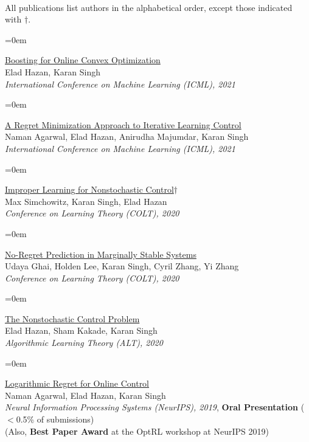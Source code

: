 \documentclass{scrartcl}
\newcommand{\Description}[1]{\hangindent=0em\hangafter=0\noindent\raggedright {#1}\par\normalsize\vspace{1em}}
\newcommand{\spacedlowallcaps}[1]{{\Large\textls[80]{\scshape \MakeTextLowercase{#1}}}}
\begin{document}
\begin{cv}{}\vspace{1.0em} 
\vspace{0.5em}\\
\noindent All publications list authors in the alphabetical order, except those indicated with $\dagger$.

\vspace{1.5em}

\noindent\spacedlowallcaps{Peer-reviewed Publications} 

\vspace{0.5em}

\Description{\href{https://proceedings.mlr.press/v139/hazan21a/hazan21a.pdf}{Boosting for Online Convex Optimization}
\\ Elad Hazan, Karan Singh\\ \textit{International Conference on Machine Learning (ICML), 2021}
}

\Description{\href{https://proceedings.mlr.press/v139/agarwal21b/agarwal21b.pdf}{A Regret Minimization Approach to Iterative Learning Control
}\\ Naman Agarwal, Elad Hazan, Anirudha Majumdar, Karan Singh\\ \textit{International Conference on Machine Learning (ICML), 2021}}

\Description{\href{https://proceedings.mlr.press/v125/simchowitz20a/simchowitz20a.pdf}{Improper Learning for Nonstochastic Control$\dagger$
}\\ Max Simchowitz, Karan Singh, Elad Hazan\\ \textit{Conference on Learning Theory (COLT), 2020}}

\Description{\href{https://proceedings.mlr.press/v125/ghai20a/ghai20a.pdf}{No-Regret Prediction in Marginally Stable Systems
}\\ Udaya Ghai, Holden Lee, Karan Singh, Cyril Zhang, Yi Zhang\\ \textit{Conference on Learning Theory (COLT), 2020}}

\Description{\href{https://proceedings.mlr.press/v117/hazan20a/hazan20a.pdf}{The Nonstochastic Control Problem}\\Elad Hazan, Sham Kakade, Karan Singh \\ \textit{Algorithmic Learning Theory (ALT), 2020}}

\Description{\href{https://papers.nips.cc/paper/2019/file/78719f11fa2df9917de3110133506521-Paper.pdf}{Logarithmic Regret for Online Control}\\ Naman Agarwal, Elad Hazan, Karan Singh\\ \textit{Neural Information Processing Systems (NeurIPS), 2019}, \textbf{Oral Presentation} ($<$0.5\% of submissions) \\ (Also, \textbf{Best Paper Award} at the OptRL workshop at NeurIPS 2019)}



\end{cv}
\end{document}
